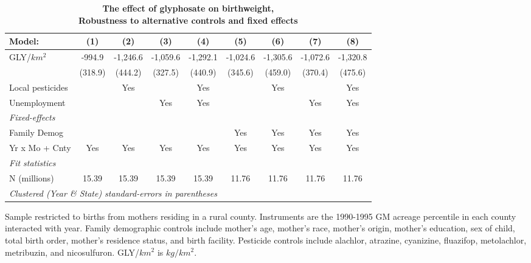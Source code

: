 \begin{table}[htbp]
   \centering
   \small
   \begin{threeparttable}[b]
      \caption{\label{tab:robust-cntrl-dbwt-percentilegmacres} \textbf{The effect of glyphosate on birthweight, \\ Robustness to alternative controls and fixed effects}}
      \begin{tabular}{lcccccccc}
         \toprule
         Model:           & (1)     & (2)      & (3)      & (4)      & (5)      & (6)      & (7)      & (8)\\  
         \midrule 
         GLY/$km^2$       & -994.9  & -1,246.6 & -1,059.6 & -1,292.1 & -1,024.6 & -1,305.6 & -1,072.6 & -1,320.8\\   
                          & (318.9) & (444.2)  & (327.5)  & (440.9)  & (345.6)  & (459.0)  & (370.4)  & (475.6)\\   
         Local pesticides &         & Yes      &          & Yes      &          & Yes      &          & Yes\\  
         Unemployment     &         &          & Yes      & Yes      &          &          & Yes      & Yes\\  
         \midrule
         \emph{Fixed-effects}\\
         Family Demog     &         &          &          &          & Yes      & Yes      & Yes      & Yes\\  
         Yr x Mo + Cnty   & Yes     & Yes      & Yes      & Yes      & Yes      & Yes      & Yes      & Yes\\  
         \midrule
         \emph{Fit statistics}\\
         N (millions)     & 15.39   & 15.39    & 15.39    & 15.39    & 11.76    & 11.76    & 11.76    & 11.76\\  
         \midrule
         \multicolumn{9}{l}{\emph{Clustered (Year \& State) standard-errors in parentheses}}\\
      \end{tabular}
      
      \begin{tablenotes}\item Sample restricted to births from mothers residing in a rural county. Instruments are the 1990-1995 GM acreage percentile in each county interacted with year. Family demographic controls include mother's age, mother's race, mother's origin, mother's education, sex of child, total birth order, mother's residence status, and birth facility. Pesticide controls include alachlor, atrazine, cyanizine, fluazifop, metolachlor, metribuzin, and nicosulfuron. GLY/$km^2$ is $kg/km^2$.
      \end{tablenotes}
   \end{threeparttable}
\end{table}
